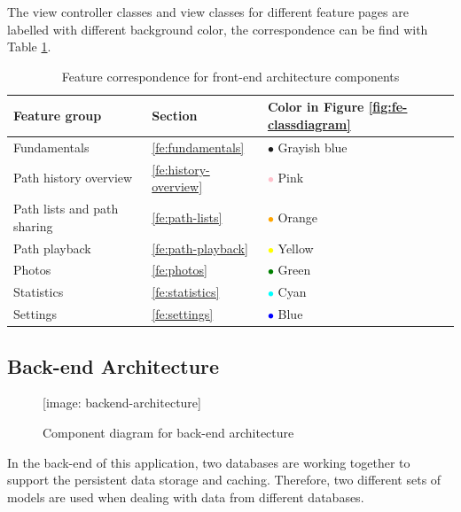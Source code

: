 \documentclass[12pt,a4paper]{article}
\renewcommand\texttt[1]{{\ttfamily\color{textttColor}#1}}
\begin{document}
        The view controller classes and view classes for different feature pages are labelled with different background color, the correspondence can be find with Table \ref{table:front-end-architecture-diagram}.
        
        \begin{table}
            \begin{tabular}{|p{} p{} p{}|}
                \hline
                \textbf{Feature group} & \textbf{Section} & \textbf{Color in Figure \ref{fig:fe-classdiagram}} \\
                \hline
                Fundamentals & \ref{fe:fundamentals} & \textcolor{grayishblue}{$\bullet$} Grayish blue\\
                Path history overview & \ref{fe:history-overview} & \textcolor{pink}{$\bullet$} Pink\\
                Path lists and path sharing & \ref{fe:path-lists} & \textcolor{orange}{$\bullet$} Orange\\
                Path playback & \ref{fe:path-playback} & \textcolor{yellow}{$\bullet$} Yellow\\
                Photos & \ref{fe:photos} & \textcolor{green}{$\bullet$} Green\\
                Statistics & \ref{fe:statistics} & \textcolor{cyan}{$\bullet$} Cyan\\
                Settings & \ref{fe:settings} & \textcolor{blue}{$\bullet$} Blue\\
                \hline
            \end{tabular}
            \caption{Feature correspondence for front-end architecture components}
            \label{table:front-end-architecture-diagram}
        \end{table}
        
        \subsection{Back-end Architecture}
        \begin{figure} [H]
            \texttt{[image: backend-architecture]}
            \centering
            \caption{Component diagram for back-end architecture}
            \label{fig:be-classdiagram}
        \end{figure}
        
        In the back-end of this application, two databases are working together to support the persistent data storage and caching. Therefore, two different sets of models are used when dealing with data from different databases.
        
\end{document}
